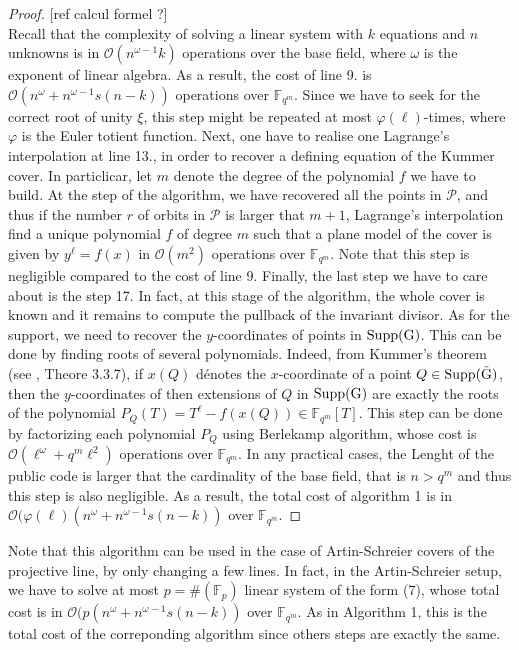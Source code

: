 \documentclass[10pt]{article}
\newcommand{\s}{\vspace{0.3cm}}
\newcommand{\calO}{\mathcal{O}}
\newcommand{\fqm}{\mathbb{F}_{q^m}}
\newcommand{\w}{\omega}
\newcommand{\PR}{\mathcal{P}}
\begin{document}
\begin{proof} \color{red} [ref calcul formel ?] \cite{CF} \color{black} \\
Recall that the complexity of solving a linear system with $k$ equations and $n$ unknowns is in $\calO(n^{\w-1}k)$ operations over the base field, where $\w$ is the exponent of linear algebra. As a result, the cost of line 9. is $\calO(n^{\w}+n^{\w-1}s(n-k))$ operations over $\fqm$. Since we have to seek for the correct root of unity $\xi$, this step might be repeated at most $\varphi(\ell)$-times, where $\varphi$ is the Euler totient function. Next, one have to realise one Lagrange's interpolation at line 13., in order to recover a defining equation of the Kummer cover. In particlicar, let $m$ denote the degree of the polynomial $f$ we have to build. At the step of the algorithm, we have recovered all the points in $\PR$, and thus if the number $r$ of orbits in $\PR$ is larger that $m+1$, Lagrange's interpolation find a unique polynomial $f$ of degree $m$ such that a plane model of the cover is given by $y^{\ell}=f(x)$ in $\calO(m^2)$ operations over $\fqm$. Note that this step is negligible compared to the cost of line 9. Finally, the last step we have to care about is the step 17. In fact, at this stage of the algorithm, the whole cover is known and it remains to compute the pullback of the invariant divisor. As for the support, we need to recover the $y$-coordinates of points in $\rm{Supp}(G)$. This can be done by finding roots of several polynomials. Indeed, from Kummer's theorem (see \cite{Sti}, Theore 3.3.7), if $x(Q)$ dénotes the $x$-coordinate of a point $Q \in \rm{Supp}(\tilde{G})$, then the $y$-coordinates of then extensions of $Q$ in $\rm{Supp}(G)$ are exactly the roots of the polynomial $P_Q(T)=T^{\ell}-f(x(Q)) \in \fqm[T]$. This step can be done by factorizing each polynomial $P_Q$ using Berlekamp algorithm, whose cost is $\calO(\ell^{\w}+q^m\ell^{2})$ operations over $\fqm$. In any practical cases, the Lenght of the public code is larger that the cardinality of the base field, that is $n > q^m$ and thus this step is also negligible. As a result, the total cost of algorithm 1 is in $\calO(\varphi(\ell)(n^{\w}+n^{\w-1}s(n-k))$ over $\fqm$.
\end{proof}

\s

Note that this algorithm can be used in the case of Artin-Schreier covers of the projective line, by only changing a few lines. In fact, in the Artin-Schreier setup, we have to solve at most $p = \#(\mathbb{F}_p)$ linear system of the form (7), whose total cost is in $\calO(p(n^{\w}+n^{\w-1}s(n-k))$ over $\fqm$. As in Algorithm 1, this is the total cost of the correponding algorithm since others steps are exactly the same.
\end{document}
